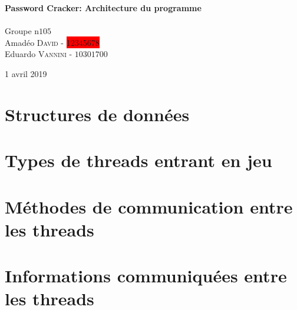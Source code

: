 \documentclass{article}
\begin{document}
\begin{titlepage}
	{\huge\bfseries Password Cracker: Architecture du programme}\\[0.4cm] %
	
	\HRule\\[1.5cm]
	
	
	Groupe n\degree$105$\\[0.2cm]
	Amadéo \textsc{David}  - \colorbox{red}{12345678}\\%
	Eduardo \textsc{Vannini} - $10301700$%
	
	
	\vfill\vfill\vfill %
	
	{\large 1\ier{} avril 2019} %
	
	
	\vfill %
	
\end{titlepage}


\section{Structures de données}

\section{Types de threads entrant en jeu}

\section{Méthodes de communication entre les threads}

\section{Informations communiquées entre les threads}
\end{document}
